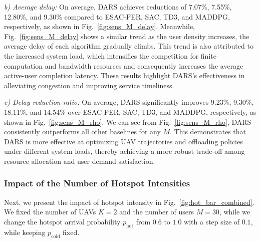 \documentclass[journal]{IEEEtran}
\begin{document}
\textit{b) Average delay:}
On average, DARS achieves reductions of 7.07\%, 7.55\%, 12.80\%, and 9.30\% compared to ESAC-PER, SAC, TD3, and MADDPG, respectively, as shown in Fig.~\ref{fig:sens_M_delay}. Meanwhile, Fig.~\ref{fig:sens_M_delay} shows a similar trend as the user density increases, the average delay of each algorithm gradually climbs. This trend is also attributed to the increased system load, which intensifies the competition for finite computation and
bandwidth resources and consequently increases the average
active-user completion latency. These results highlight DARS’s effectiveness in alleviating congestion and improving service timeliness.

\textit{c) Delay reduction ratio:} 
On average, DARS significantly improves 9.23\%, 9.30\%, 18.11\%, and 14.54\% over ESAC-PER, SAC, TD3, and MADDPG, respectively, as shown in Fig.~\ref{fig:sens_M_rho}. We can see from Fig.~\ref{fig:sens_M_rho}, DARS consistently outperforms all other baselines for any $M$. This demonstrates that DARS is more effective at optimizing UAV trajectories and offloading policies under different system loads, thereby achieving a more robust trade-off among resource allocation and user demand satisfaction.




\subsubsection{Impact of the Number of Hotspot Intensities}
Next, we present the impact of hotspot intensity in Fig.~\ref{fig:hot_bar_combined}. We fixed the number of UAVs $K=2$ and the number of users $M=30$, while we change the hotspot arrival probability $p_{\mathrm{hot}}$ from $0.6$ to
$1.0$ with a step size of $0.1$, while keeping $p_{\mathrm{cold}}$ fixed.
\end{document}
